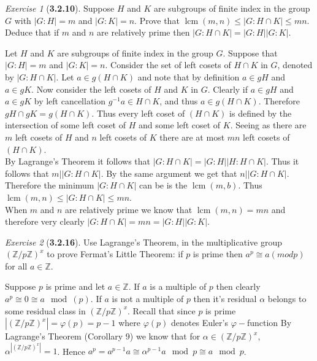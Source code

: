 \documentclass[12pt]{amsart}
\makeatletter
\theoremstyle{remark}
\newtheorem*{exercise}{Exercise}%
\def\ZZ{\ensuremath{\mathbb Z}}
\renewenvironment{proof}[1][\proofname]{\par\doublespacing
  \pushQED{\qed}%
  \normalfont \topsep6\p@\@plus6\p@\relax
  \list{}{%
    \settowidth{\leftmargin}{\itshape\proofname:\hskip\labelsep}%
    \setlength{\labelwidth}{0pt}%
    \setlength{\itemindent}{-\leftmargin}%
  }%
  \item[\hskip\labelsep\itshape#1\@addpunct{:}]\ignorespaces
}{%
  \popQED\endlist\@endpefalse
  \singlespacing
}
\theoremstyle{mycomment}
\DeclareMathOperator{\lcm}{lcm}
\makeatother
\begin{document}
\begin{exercise}[\textbf{3.2.10}]Suppose $H$ and $K$ are subgroups of finite index in the group $G$ 
  with $|G:H| = m$ and $|G:K| = n$. Prove that $\lcm(m, n) \leq |G:H\cap K| \leq mn$. Deduce that if $m$
  and $n$ are relatively prime then $|G:H\cap K| = |G:H||G:K|$.
  \begin{proof} Let $H$ and $K$ are subgroups of finite index in the group $G$. Suppose that $|G:H| = m$ and $|G:K| = n$. Consider the set of left cosets of $H \cap K$ in $G$, denoted by $|G:H\cap K|$. Let $a \in g(H \cap K)$ and note that by definition $a \in gH$ and $a \in gK$. Now consider the left cosets of $H$ and $K$ in $G$. Clearly if $a \in gH$ and $a \in gK$ by left cancellation $g^{-1}a \in H \cap K$, and thus $a \in g(H \cap K)$. Therefore $gH \cap gK = g(H \cap K)$. Thus every left coset of $(H \cap K)$ is defined by the intersection of some left coset of $H$ and some left coset of $K$. Seeing as there are $m$ left cosets of $H$ and $n$ left cosets of $K$ there are at most $mn$ left cosets of $(H \cap K)$.\\
    
    By Lagrange's Theorem it follows that $|G:H\cap K| = |G:H||H:H\cap K|$. Thus it follows that $m | |G:H\cap K|$. By the same argument we get that $n | |G:H\cap K|$. Therefore the minimum $|G:H\cap K|$ can be is the $\lcm(m, b)$. Thus $\lcm(m, n) \leq |G:H\cap K| \leq mn$.\\

    When $m$ and $n$ are relatively prime we know that $\lcm(m, n) = mn$ and therefore very clearly $|G:H\cap K| = mn = |G:H||G:K|$.
    \end{proof}
\end{exercise}
\vspace{.15in}




\begin{exercise}[\textbf{3.2.16}] Use Lagrange's Theorem, in the multiplicative group $(\ZZ/p\ZZ)^x$ to prove Fermat's Little Theorem: if 
  $p$ is prime then $a^p \cong a(mod p)$ for all $a \in \ZZ$.
   \begin{proof} Suppose $p$ is prime and let $a \in \ZZ$. If $a$ is a multiple of $p$ then clearly $a^p \cong 0 \cong a \mod(p)$.
    If $a$ is not a multiple of $p$ then it's residual $\alpha$ belongs to some residual class in $(\ZZ/p\ZZ)^x$. 
    Recall that since $p$ is prime $|(\ZZ/p\ZZ)^x| = \varphi(p) =  p-1$ where $\varphi(p)$ denotes Euler's $\varphi-$function  By Lagrange's Theorem (Corollary 9) we know that for $\alpha \in (\ZZ/p\ZZ)^x$, $\alpha^{|(\ZZ/p\ZZ)^x|} = 1$. Hence $a^{p} = a^{p - 1}a \cong \alpha^{p - 1}a \mod p \cong a \mod p$. 
    \end{proof}
\end{exercise}
\vspace{.15in}
\end{document}
